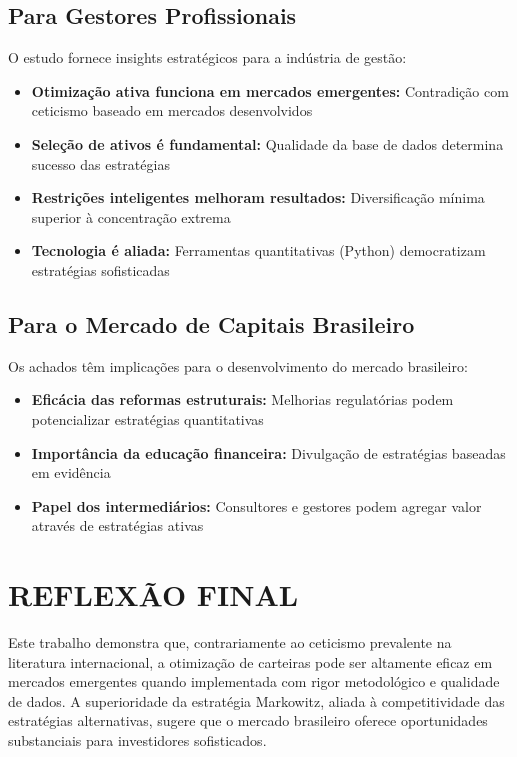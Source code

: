 \subsection{Para Gestores Profissionais}

O estudo fornece insights estratégicos para a indústria de gestão:

\begin{itemize}
    \item \textbf{Otimização ativa funciona em mercados emergentes:} Contradição com ceticismo baseado em mercados desenvolvidos
    \item \textbf{Seleção de ativos é fundamental:} Qualidade da base de dados determina sucesso das estratégias
    \item \textbf{Restrições inteligentes melhoram resultados:} Diversificação mínima superior à concentração extrema
    \item \textbf{Tecnologia é aliada:} Ferramentas quantitativas (Python) democratizam estratégias sofisticadas
\end{itemize}

\subsection{Para o Mercado de Capitais Brasileiro}

Os achados têm implicações para o desenvolvimento do mercado brasileiro:

\begin{itemize}
    \item \textbf{Eficácia das reformas estruturais:} Melhorias regulatórias podem potencializar estratégias quantitativas
    \item \textbf{Importância da educação financeira:} Divulgação de estratégias baseadas em evidência
    \item \textbf{Papel dos intermediários:} Consultores e gestores podem agregar valor através de estratégias ativas
\end{itemize}

\section{REFLEXÃO FINAL}

Este trabalho demonstra que, contrariamente ao ceticismo prevalente na literatura internacional, a otimização de carteiras pode ser altamente eficaz em mercados emergentes quando implementada com rigor metodológico e qualidade de dados. A superioridade da estratégia Markowitz, aliada à competitividade das estratégias alternativas, sugere que o mercado brasileiro oferece oportunidades substanciais para investidores sofisticados.

